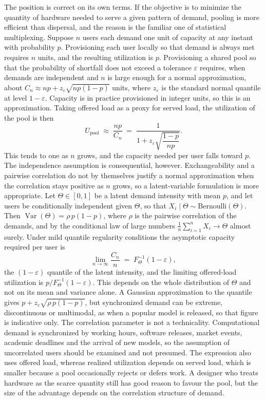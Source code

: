 \documentclass[11pt]{article}
\theoremstyle{plain}
\theoremstyle{definition}
\begin{document}
The position is correct on its own terms. If the objective is to minimize the quantity of hardware needed to serve a given pattern of demand, pooling is more efficient than dispersal, and the reason is the familiar one of statistical multiplexing. Suppose $n$ users each demand one unit of capacity at any instant with probability $p$. Provisioning each user locally so that demand is always met requires $n$ units, and the resulting utilization is $p$. Provisioning a shared pool so that the probability of shortfall does not exceed a tolerance $\varepsilon$ requires, when demands are independent and $n$ is large enough for a normal approximation, about $C_n\approx np+z_{\varepsilon}\sqrt{np(1-p)}$ units, where $z_{\varepsilon}$ is the standard normal quantile at level $1-\varepsilon$. Capacity is in practice provisioned in integer units, so this is an approximation. Taking offered load as a proxy for served load, the utilization of the pool is then
\[
U_{\mathrm{pool}} \;\approx\; \frac{np}{C_n} \;=\; \frac{1}{1+z_{\varepsilon}\sqrt{\dfrac{1-p}{np}}}.
\]
This tends to one as $n$ grows, and the capacity needed per user falls toward $p$. The independence assumption is consequential, however. Exchangeability and a pairwise correlation do not by themselves justify a normal approximation when the correlation stays positive as $n$ grows, so a latent-variable formulation is more appropriate. Let $\Theta\in[0,1]$ be a latent demand intensity with mean $p$, and let users be conditionally independent given $\Theta$, so that $X_i\mid\Theta\sim\mathrm{Bernoulli}(\Theta)$. Then $\operatorname{Var}(\Theta)=\rho\,p(1-p)$, where $\rho$ is the pairwise correlation of the demands, and by the conditional law of large numbers $\frac1n\sum_{i=1}^{n}X_i\to\Theta$ almost surely. Under mild quantile regularity conditions the asymptotic capacity required per user is
\[
\lim_{n\to\infty}\frac{C_n}{n}\;=\;F_{\Theta}^{-1}(1-\varepsilon),
\]
the $(1-\varepsilon)$ quantile of the latent intensity, and the limiting offered-load utilization is $p/F_{\Theta}^{-1}(1-\varepsilon)$. This depends on the whole distribution of $\Theta$ and not on its mean and variance alone. A Gaussian approximation to the quantile gives $p+z_{\varepsilon}\sqrt{\rho\,p(1-p)}$, but synchronized demand can be extreme, discontinuous or multimodal, as when a popular model is released, so that figure is indicative only. The correlation parameter is not a technicality. Computational demand is synchronized by working hours, software releases, market events, academic deadlines and the arrival of new models, so the assumption of uncorrelated users should be examined and not presumed. The expression also uses offered load, whereas realized utilization depends on served load, which is smaller because a pool occasionally rejects or defers work. A designer who treats hardware as the scarce quantity still has good reason to favour the pool, but the size of the advantage depends on the correlation structure of demand.
\end{document}
